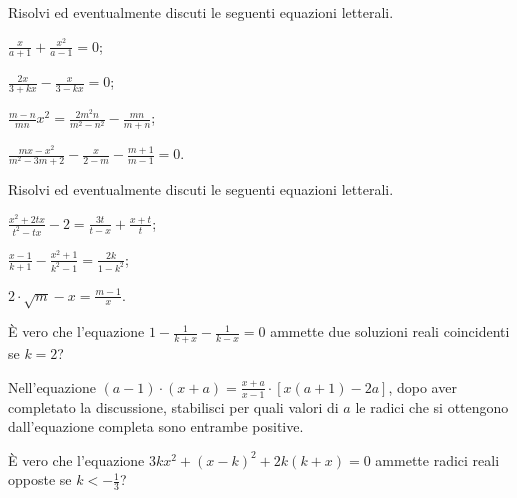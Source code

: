 \begin{esercizio}[\Ast]
 \label{ese:3.56}
Risolvi ed eventualmente discuti le seguenti equazioni letterali.
\begin{multicols}{2}
\begin{enumeratea}
\item $\frac{x}{a + 1} + \frac{x^{2}}{a-1} = 0$;
\item $\frac{2 x}{3 + k x}-\frac{x}{3-k x}=0$;
\item $\frac{m-n}{m n} x^{2}=\frac{2 m^{2} n}{m^{2}-n^{2}}-\frac{m n}{m + n}$;
\item $\frac{m x-x^{2}}{m^{2}-3 m + 2}-\frac{x}{2-m} -\frac{m + 1}{m-1}=0$.
\end{enumeratea}
\end{multicols}
\end{esercizio}
\pagebreak
\begin{esercizio}[\Ast]
 \label{ese:3.57}
Risolvi ed eventualmente discuti le seguenti equazioni letterali.
\begin{multicols}{2}
\begin{enumeratea}
\item $\frac{x^{2} + 2 t x}{t^{2}-t x}-2=\frac{3 t}{t-x}+ \frac{x + t}{t}$;
\item $\frac{x-1}{k + 1}-\frac{x^{2} + 1}{k^{2}-1} =\frac{2 k}{1-k^{2}}$;
\item $2 \cdot \sqrt{m}-x=\frac{m-1}{x}$.
\end{enumeratea}
\end{multicols}
\end{esercizio}

\begin{esercizio}
 \label{ese:3.58}
È vero che l'equazione $1-\frac{1}{k + x}-\frac{1}{k-x}=0$ ammette due soluzioni reali coincidenti se $k = 2$?
\end{esercizio}

\begin{esercizio}
 \label{ese:3.59}
Nell'equazione $(a-1) \cdot (x + a)=\frac{x + a}{x-1} \cdot [ x (a +1)-2 a ]$, dopo aver completato la discussione, stabilisci per quali valori di $a$ le
radici che si ottengono dall'equazione completa sono entrambe positive.
\end{esercizio}

\begin{esercizio}
 \label{ese:3.60}
È vero che l'equazione $3 k x^{2} + (x-k)^{2} + 2 k (k + x)=0$ ammette radici reali opposte se $k <-\frac{1}{3}$?
\end{esercizio}


